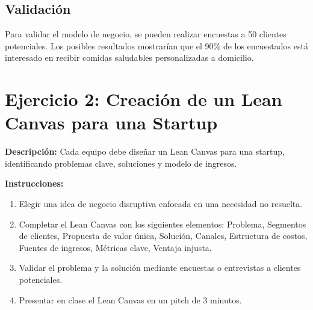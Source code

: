 \documentclass[a4paper,10pt]{article}
\begin{document}
\begin{center}
\end{center}

\subsection{Validación}
Para validar el modelo de negocio, se pueden realizar encuestas a 50 clientes potenciales. Los posibles resultados mostrarían que el 90\% de los encuestados está interesado en recibir comidas saludables personalizadas a domicilio.
\newpage
\section*{Ejercicio 2: Creación de un Lean Canvas para una Startup}
\textbf{Descripción:} Cada equipo debe diseñar un Lean Canvas para una startup, identificando problemas clave, soluciones y modelo de ingresos.

\textbf{Instrucciones:}
\begin{enumerate}
    \item Elegir una idea de negocio disruptiva enfocada en una necesidad no resuelta.
    \item Completar el Lean Canvas con los siguientes elementos: Problema, Segmentos de clientes, Propuesta de valor única, Solución, Canales, Estructura de costos, Fuentes de ingresos, Métricas clave, Ventaja injusta.
    \item Validar el problema y la solución mediante encuestas o entrevistas a clientes potenciales.
    \item Presentar en clase el Lean Canvas en un pitch de 3 minutos.
\end{enumerate}
\end{document}
